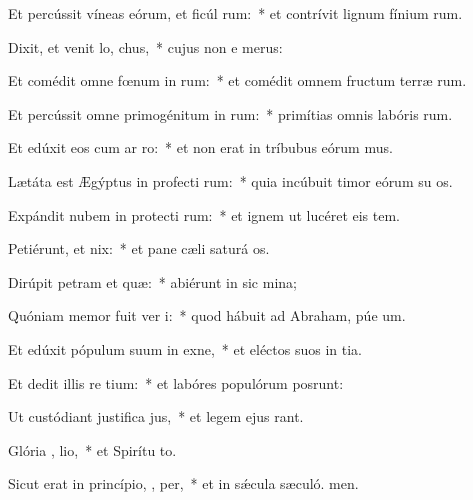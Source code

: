\item Et percússit víneas eórum, et ficúl rum:~* et contrívit lignum fínium rum.
\item Dixit, et venit lo,  chus,~* cujus non e merus:
\item Et comédit omne fœnum in  rum:~* et comédit omnem fructum terræ rum.
\item Et percússit omne primogénitum in  rum:~* primítias omnis labóris rum.
\item Et edúxit eos cum ar  ro:~* et non erat in tríbubus eórum mus.
\item Lætáta est Ægýptus in profecti rum:~* quia incúbuit timor eórum su os.
\item Expándit nubem in protecti rum:~* et ignem ut lucéret eis  tem.
\item Petiérunt, et  nix:~* et pane cæli saturá os.
\item Dirúpit petram et  quæ:~* abiérunt in sic mina;
\item Quóniam memor fuit ver  i:~* quod hábuit ad Abraham, púe um.
\item Et edúxit pópulum suum in exne,~* et eléctos suos in tia.
\item Et dedit illis re tium:~* et labóres populórum posrunt:
\item Ut custódiant justifica jus,~* et legem ejus rant.
\item Glória ,  lio,~* et Spirítu to.
\item Sicut erat in princípio,  ,  per,~* et in sǽcula sæculó. men.
